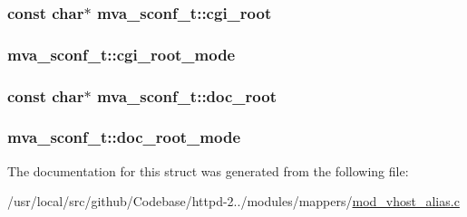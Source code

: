\subsubsection[{\texorpdfstring{cgi\+\_\+root}{cgi_root}}]{\setlength{\rightskip}{0pt plus 5cm}const char$\ast$ mva\+\_\+sconf\+\_\+t\+::cgi\+\_\+root}\hypertarget{structmva__sconf__t_aa350394f659834b41c8474b59ffc3f6d}{}\label{structmva__sconf__t_aa350394f659834b41c8474b59ffc3f6d}
\subsubsection[{\texorpdfstring{cgi\+\_\+root\+\_\+mode}{cgi_root_mode}}]{ mva\+\_\+sconf\+\_\+t\+::cgi\+\_\+root\+\_\+mode}\hypertarget{structmva__sconf__t_a0a6b7c57321b41fe3e06d1fbfb8a169f}{}\label{structmva__sconf__t_a0a6b7c57321b41fe3e06d1fbfb8a169f}
\subsubsection[{\texorpdfstring{doc\+\_\+root}{doc_root}}]{\setlength{\rightskip}{0pt plus 5cm}const char$\ast$ mva\+\_\+sconf\+\_\+t\+::doc\+\_\+root}\hypertarget{structmva__sconf__t_acd2f5b7f4969410371331f8a54679ef5}{}\label{structmva__sconf__t_acd2f5b7f4969410371331f8a54679ef5}
\subsubsection[{\texorpdfstring{doc\+\_\+root\+\_\+mode}{doc_root_mode}}]{ mva\+\_\+sconf\+\_\+t\+::doc\+\_\+root\+\_\+mode}\hypertarget{structmva__sconf__t_a088901826ec13c01458299a052be62e2}{}\label{structmva__sconf__t_a088901826ec13c01458299a052be62e2}


The documentation for this struct was generated from the following file\+:\begin{DoxyCompactItemize}
\item 
/usr/local/src/github/\+Codebase/httpd-\/2../modules/mappers/\hyperlink{mod__vhost__alias_8c}{mod\+\_\+vhost\+\_\+alias.\+c}\end{DoxyCompactItemize}
